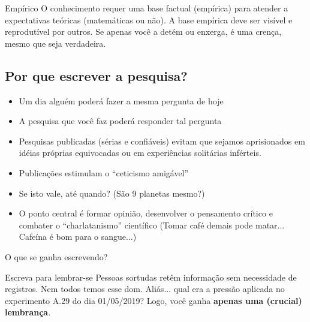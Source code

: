 \begin{frame}
\begin{block}{Empírico}
O conhecimento requer uma base factual (empírica) para atender a expectativas teóricas (matemáticas ou não). A base empírica deve ser visível e reprodutível por outros. Se apenas você a detém ou enxerga, é uma crença, mesmo que seja verdadeira.
\end{block}
\end{frame}


\subsection*{Por que escrever a pesquisa?}

\begin{frame}
\begin{itemize}
\item Um dia alguém poderá fazer a mesma pergunta de hoje
\item A pesquisa que você faz poderá responder tal pergunta
\item Pesquisas publicadas (sérias e confiáveis) evitam que sejamos aprisionados em idéias próprias equivocadas ou em experiências solitárias inférteis.
\end{itemize}
\end{frame}

\begin{frame}
\begin{itemize}
\item Publicações estimulam o ``ceticismo amigável''
\item Se isto vale, até quando? (São 9 planetas mesmo?) 
\item O ponto central é formar opinião, desenvolver o pensamento crítico e combater o ``charlatanismo'' científico (Tomar café demais pode matar... Cafeína é bom para o sangue...)
\end{itemize}
\end{frame}

\begin{frame}{O que se ganha escrevendo?}
\begin{block}{Escreva para lembrar-se}
Pessoas sortudas retêm informação sem necessidade de registros. Nem todos temos esse dom. Aliás... qual era a pressão aplicada no experimento A.29 do dia 01/05/2019? Logo, você ganha \textbf{apenas uma (crucial) lembrança}. 
\end{block}
\end{frame}


